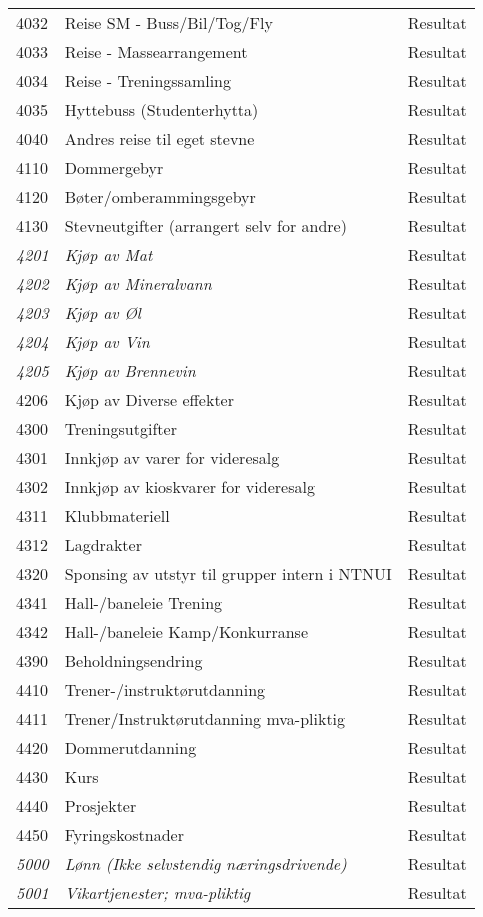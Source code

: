 \begin{longtable}{l l l}
4032 & Reise SM - Buss/Bil/Tog/Fly & Resultat\\
4033 & Reise -  Massearrangement & Resultat\\
4034 & Reise - Treningssamling & Resultat\\
4035 & Hyttebuss (Studenterhytta) & Resultat\\
4040 & Andres reise til eget stevne & Resultat\\
4110 & Dommergebyr & Resultat\\
4120 & Bøter/omberammingsgebyr & Resultat\\
4130 & Stevneutgifter (arrangert selv for andre) & Resultat\\
\emph{4201} & \emph{Kjøp av Mat} & Resultat\\
\emph{4202} & \emph{Kjøp av Mineralvann} & Resultat\\
\emph{4203} & \emph{Kjøp av Øl} & Resultat\\
\emph{4204} & \emph{Kjøp av Vin} & Resultat\\
\emph{4205} & \emph{Kjøp av Brennevin} & Resultat\\
4206 & Kjøp av Diverse effekter & Resultat\\
4300 & Treningsutgifter & Resultat\\
4301 & Innkjøp av varer for videresalg & Resultat\\
4302 & Innkjøp av kioskvarer for videresalg & Resultat\\
4311 & Klubbmateriell & Resultat\\
4312 & Lagdrakter & Resultat\\
4320 & Sponsing av utstyr til grupper intern i NTNUI & Resultat\\
4341 & Hall-/baneleie Trening & Resultat\\
4342 & Hall-/baneleie Kamp/Konkurranse & Resultat\\
4390 & Beholdningsendring & Resultat\\
4410 & Trener-/instruktørutdanning & Resultat\\
4411 & Trener/Instruktørutdanning mva-pliktig & Resultat\\
4420 & Dommerutdanning & Resultat\\
4430 & Kurs & Resultat\\
4440 & Prosjekter & Resultat\\
4450 & Fyringskostnader & Resultat\\
\emph{5000} & \emph{Lønn (Ikke selvstendig næringsdrivende)} & Resultat\\
\emph{5001} & \emph{Vikartjenester; mva-pliktig} & Resultat\\

\end{longtable}
